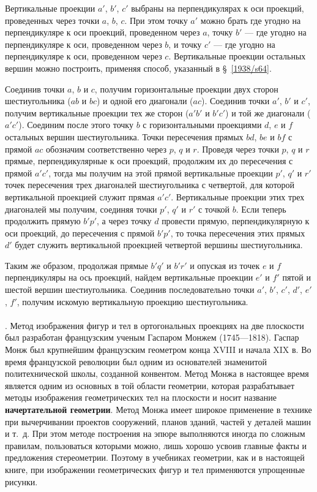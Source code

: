 \documentclass[twoside]{book}
\begin{document}
Вертикальные проекции $a'$, $b'$, $c'$ выбраны на перпендикулярах к оси проекций, проведенных через точки $a$, $b$, $c$.
При этом точку $a'$ можно брать где угодно на перпендикуляре к оси проекций, проведенном через $a$, точку $b'$ --- где угодно на перпендикуляре к оси, проведенном через $b$, и точку $c'$ --- где угодно на перпендикуляре к оси, проведенном через $c$.
Вертикальные проекции остальных вершин можно построить, применяя способ, указанный в §~\ref{1938/s64}.

Соединив точки $a$, $b$ и $c$, получим горизонтальные проекции двух сторон шестиугольника ($ab$ и $bc$) и одной его диагонали ($ac$).
Соединив точки $a'$, $b'$ и $c'$, получим вертикальные проекции тех же сторон ($a'b'$ и $b'c'$) и той же диагонали ($a'c'$).
Соединим после этого точку $b$ с горизонтальными проекциями $d$, $e$ и $f$ остальных вершин шестиугольника.
Точки пересечения прямых $bd$, $be$ и $bf$ с прямой $ac$ обозначим соответственно через $p$, $q$ и $r$.
Проведя через точки $p$, $q$ и $r$ прямые, перпендикулярные к оси проекций, продолжим их до пересечения с прямой $a'c'$, тогда мы получим на этой прямой вертикальные проекции $p'$, $q'$ и $r'$ точек пересечения трех диагоналей шестиугольника с четвертой, для которой вертикальной проекцией служит прямая $a'c'$.
Вертикальные проекции этих трех диагоналей мы получим, соединяя точки $p'$, $q'$ и $r'$ с точкой $b$.
Если теперь продолжить прямую $b'p'$, а через точку $d$ провести прямую, перпендикулярную к оси проекций, до пересечения с прямой $b'p'$, то точка пересечения этих прямых $d'$ будет служить вертикальной проекцией четвертой вершины шестиугольника.

Таким же образом, продолжая прямые $b'q'$ и $b'r'$ и опуская из точек $e$ и $f$ перпендикуляры на ось проекций, найдем вертикальные проекции $e'$ и $f'$ пятой и шестой вершин шестиугольника.
Соединив последовательно точки $a'$, $b'$, $c'$, $d'$, $e'$, $f'$, получим искомую вертикальную проекцию шестиугольника.

\paragraph{}\label{1938/s66}
.
Метод изображения фигур и тел в ортогональных проекциях на две плоскости был разработан французским ученым Гаспаром Монжем (1745---1818).
Гаспар Монж был крупнейшим французским геометром конца XVIII и начала XIX в.
Во время французской революции был одним из основателей знаменитой политехнической школы, созданной конвентом.
Метод Монжа в настоящее время является одним из основных в той области геометрии, которая разрабатывает методы изображения геометрических тел на плоскости и носит название \textbf{начертательной геометрии}.
Метод Монжа имеет широкое применение в технике при вычерчивании проектов сооружений, планов зданий, частей у деталей машин и т.~д.
При этом методе построения на эпюре выполняются иногда по сложным правилам, пользоваться которыми можно, лишь хорошо усвоив главные факты и предложения стереометрии.
Поэтому в учебниках геометрии, как и в настоящей книге, при изображении геометрических фигур и тел применяются упрощенные рисунки.
\end{document}
